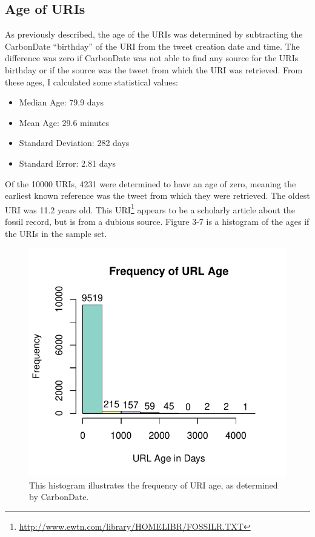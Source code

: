 \documentclass[a4paper,12pt]{article}
\begin{document}
\subsection{Age of URIs}
As previously described, the age of the URIs was determined by subtracting the CarbonDate
``birthday'' of the URI from the tweet creation date and time. The difference was zero if
CarbonDate was not able to find any source for the URIs birthday or if the source was the
tweet from which the URI was retrieved. From these ages, I calculated some statistical values:
\begin{itemize}
    \item Median Age: 79.9 days
    \item Mean Age: 29.6 minutes
    \item Standard Deviation: 282 days
    \item Standard Error: 2.81 days
\end{itemize}
Of the 10000 URIs, 4231 were determined to have an age of zero, meaning the earliest known
reference was the tweet from which they were retrieved. The oldest URI was 11.2 years old.
This URI\footnote{\url{http://www.ewtn.com/library/HOMELIBR/FOSSILR.TXT}} appears to be a
scholarly article about the fossil record, but is from a dubious source. Figure 3-7 is a
histogram of the ages if the URIs in the sample set.
\begin{figure}[H]
    \centering
    \includegraphics{stats/time_deltas.pdf}
    \caption{This histogram illustrates the frequency of URI age, as determined by CarbonDate.}
\end{figure}
\end{document}

